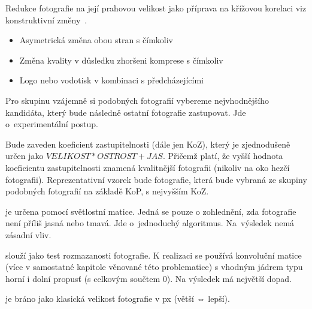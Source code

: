Redukce fotografie na její prahovou velikost jako příprava na křížovou korelaci viz konstruktivní změny~\cite{fftw3}.

\begin{itemize}
	\setlength{\parskip}{0pt}
	\setlength{\itemsep}{0pt}
	\item {Asymetrická změna obou stran s čímkoliv}
	\item {Změna kvality v důsledku zhoršeni komprese s čímkoliv}
	\item {Logo nebo vodotisk v kombinaci s předcházejícími}
\end{itemize}

Pro skupinu vzájemně si podobných fotografií vybereme nejvhodnějšího kandidáta, který bude následně ostatní fotografie zastupovat. Jde o~experimentální postup.

Bude zaveden koeficient zastupitelnosti (dále jen KoZ), který je zjednodušeně určen jako $ VELIKOST * OSTROST + JAS $. Přičemž platí, že vyšší hodnota koeficientu zastupitelnosti znamená kvalitnější fotografii (nikoliv na oko hezčí fotografii). Reprezentativní vzorek bude fotografie, která bude vybraná ze skupiny podobných fotografií na základě KoP, s nejvyšším KoZ.


je určena pomocí světlostní matice. Jedná se pouze o zohlednění, zda fotografie není příliš jasná nebo tmavá. Jde o~jednoduchý algoritmus. Na~výsledek nemá zásadní vliv.

slouží jako test rozmazanosti fotografie. K realizaci se používá konvoluční matice (více v samostatné kapitole věnované této problematice) s vhodným jádrem typu horní i dolní propusť (s celkovým součtem 0). Na výsledek má největší dopad.

je bráno jako klasická velikost fotografie v px (větší ⇔ lepší).


